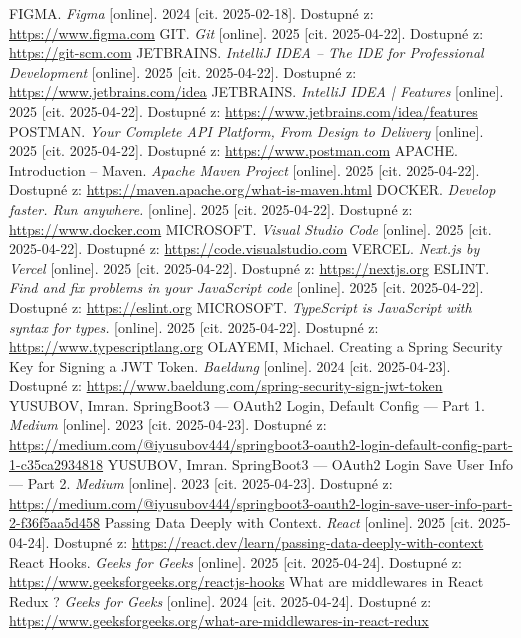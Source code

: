 \documentclass[twoside]{ctuthesis}
\begin{document}
\begin{thebibliography}{1}
FIGMA. \emph{Figma} [online]. 2024 [cit. 2025-02-18]. Dostupné z: \url{https://www.figma.com}
GIT. \emph{Git} [online]. 2025 [cit. 2025-04-22]. Dostupné z: \url{https://git-scm.com}
JETBRAINS. \emph{IntelliJ IDEA – The IDE for Professional Development} [online]. 2025 [cit. 2025-04-22]. Dostupné z: \url{https://www.jetbrains.com/idea}
JETBRAINS. \emph{IntelliJ IDEA | Features} [online]. 2025 [cit. 2025-04-22]. Dostupné z: \url{https://www.jetbrains.com/idea/features}
POSTMAN. \emph{Your Complete API Platform, From Design to Delivery} [online]. 2025 [cit. 2025-04-22]. Dostupné z: \url{https://www.postman.com}
APACHE. Introduction – Maven. \emph{Apache Maven Project} [online]. 2025 [cit. 2025-04-22]. Dostupné z: \url{https://maven.apache.org/what-is-maven.html}
DOCKER. \emph{Develop faster. Run anywhere.} [online]. 2025 [cit. 2025-04-22]. Dostupné z: \url{https://www.docker.com}
MICROSOFT. \emph{Visual Studio Code} [online]. 2025 [cit. 2025-04-22]. Dostupné z: \url{https://code.visualstudio.com}
VERCEL. \emph{Next.js by Vercel} [online]. 2025 [cit. 2025-04-22]. Dostupné z: \url{https://nextjs.org}
ESLINT. \emph{Find and fix problems in your JavaScript code} [online]. 2025 [cit. 2025-04-22]. Dostupné z: \url{https://eslint.org}
MICROSOFT. \emph{TypeScript is JavaScript with syntax for types.} [online]. 2025 [cit. 2025-04-22]. Dostupné z: \url{https://www.typescriptlang.org}
OLAYEMI, Michael. Creating a Spring Security Key for Signing a JWT Token. \emph{Baeldung} [online]. 2024 [cit. 2025-04-23]. Dostupné z: \url{https://www.baeldung.com/spring-security-sign-jwt-token}
YUSUBOV, Imran. SpringBoot3 — OAuth2 Login, Default Config — Part 1. \emph{Medium} [online]. 2023 [cit. 2025-04-23]. Dostupné z: \url{https://medium.com/@iyusubov444/springboot3-oauth2-login-default-config-part-1-c35ca2934818}
YUSUBOV, Imran. SpringBoot3 — OAuth2 Login Save User Info— Part 2. \emph{Medium} [online]. 2023 [cit. 2025-04-23]. Dostupné z: \url{https://medium.com/@iyusubov444/springboot3-oauth2-login-save-user-info-part-2-f36f5aa5d458}
Passing Data Deeply with Context. \emph{React} [online]. 2025 [cit. 2025-04-24]. Dostupné z: \url{https://react.dev/learn/passing-data-deeply-with-context}
React Hooks. \emph{Geeks for Geeks} [online]. 2025 [cit. 2025-04-24]. Dostupné z: \url{https://www.geeksforgeeks.org/reactjs-hooks}
What are middlewares in React Redux ? \emph{Geeks for Geeks} [online]. 2024 [cit. 2025-04-24]. Dostupné z: \url{https://www.geeksforgeeks.org/what-are-middlewares-in-react-redux}

\end{thebibliography}
\end{document}
